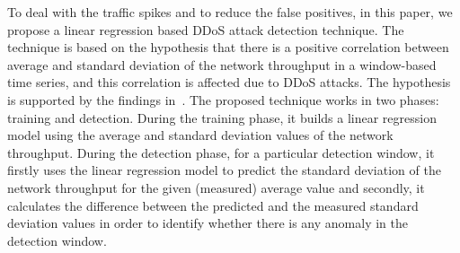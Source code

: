 
To deal with the traffic spikes and to reduce the false positives, in this paper, we propose a linear regression based DDoS attack detection technique. The technique is based on the hypothesis that there is a positive correlation between average and standard deviation of the network throughput in a window-based time series, and this correlation is affected due to DDoS attacks. The hypothesis is supported by the findings in~\cite{variance}.
The proposed technique works in two phases: training and detection. During the training phase, it builds a linear regression model using the average and standard deviation values of the network throughput. During the detection phase, for a particular detection window, it firstly uses the linear regression model to predict the standard deviation of the network throughput for the given (measured) average value and secondly, it calculates the difference between the predicted and the measured standard deviation values in order to identify whether there is any anomaly in the detection window. 


